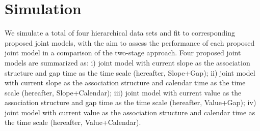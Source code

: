 \section{Simulation} \label{sec:chp3_sim}

We simulate a total of four hierarchical data sets and fit to corresponding proposed joint models, with the aim to assess the performance of each proposed joint model in a comparison of the two-stage approach. Four proposed joint models are summarized as: i) joint model with current slope as the association structure and gap time as the time scale (hereafter, Slope+Gap); ii) joint model with current slope as the association structure and calendar time as the time scale (hereafter, Slope+Calendar); iii) joint model with current value as the association structure and gap time as the time scale (hereafter, Value+Gap); iv) joint model with current value as the association structure and calendar time as the time scale (hereafter, Value+Calendar). 

